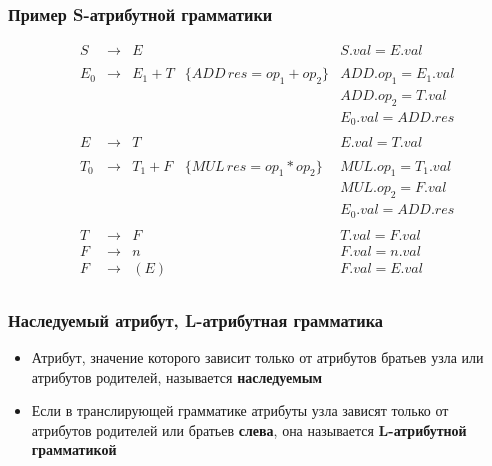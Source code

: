 \documentclass{beamer}
\begin{document}
\begin{frame}[fragile]
  \transwipe[direction=90]
  \frametitle{Пример S-атрибутной грамматики}
$$
\begin{array}{ccclll}
&S  & \rightarrow & E       &                                & S.val = E.val \\~\\

&E_0& \rightarrow & E_1 + T & \{ ADD \, res = op_1 + op_2 \} & ADD.op_1 = E_1.val \\
&   &             &         &                                & ADD.op_2 = T.val \\
&   &             &         &                                & E_0.val = ADD.res \\~\\ 

&E  & \rightarrow & T       &                                & E.val = T.val \\~\\

&T_0& \rightarrow & T_1 + F & \{ MUL \, res = op_1 * op_2 \} & MUL.op_1 = T_1.val \\
&   &             &         &                                & MUL.op_2 = F.val \\
&   &             &         &                                & E_0.val = ADD.res \\~\\ 

&T  & \rightarrow & F       &                                & T.val = F.val \\
&F  & \rightarrow & n       &                                & F.val = n.val \\
&F  & \rightarrow & (E)     &                                & F.val = E.val \\

\end{array}
$$  
\end{frame}

\begin{frame}[fragile]
  \transwipe[direction=90]
  \frametitle{Наследуемый атрибут, L-атрибутная грамматика}
  \begin{itemize}
    \item Атрибут, значение которого зависит только от атрибутов братьев узла или атрибутов родителей, называется \textbf{наследуемым}
    \item Если в транслирующей грамматике атрибуты узла зависят только от атрибутов родителей или братьев \textbf{слева}, она называется \textbf{L-атрибутной грамматикой}
  \end{itemize}    
\end{frame}
\end{document}
